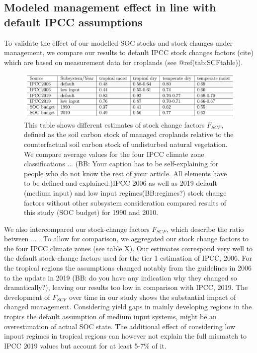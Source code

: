 \documentclass[gc, manuscript]{copernicus}
\begin{document}
\subsection{Modeled management effect in line with default IPCC
assumptions}

To validate the effect of our modelled SOC stocks and stock changes
under management, we compare our results to default IPCC stock changes
factors (cite) which are based on measurement data for croplands (see
@ref(tab:SCFtable)).

\begin{figure}[H]
\includegraphics[width=16cm]{../ResultNotebooks/Output/Images/TableSCF_comparison} \caption{This table shows different estimates of stock change factors $F_{SCF}$, defined as the soil carbon stock of managed croplands relative to the counterfactual soil carbon stock of undisturbed natural vegetation. We compare average values for the four IPCC climate zone classifications ... (BB: Your caption has to be self-explaining for people who do not know the rest of your article. All elements have to be defined and explained.)IPCC 2006 as well as 2019 default (medium input) and low input regimes(BB:regimes?) stock change factors  without other subsystem consideration compared results of this study (SOC budget) for 1990 and 2010.}\label{fig:SCFtable}
\end{figure}

We also intercompared our stock-change factors \(F_{SCF}\), which describe the ratio between ... . 
To allow for comparison, we aggregated our stock change factors to the four IPCC climate zones (see table X).
Our estimates correspond very well to the default stock-change factors used for the tier 1 estimation of IPCC, 2006. For the tropical
regions the assumptions changed notably from the guidelines in 2006 to
the update in 2019 (BB: do you have any indication why they changed so dramatically?), leaving our results too low in comparison with IPCC,
2019. The development of \(F_{SCF}\) over time in our study shows the substantial impact of changed management.
Considering yield gaps in mainly developing regions in the tropics
the default assumption of medium input systems, might be an
overestimation of actual SOC state. The additional effect of considering
low inpout regimes in tropical regions can however not explain the full
mismatch to IPCC 2019 values but account for at least 5-7\% of it.
\end{document}
